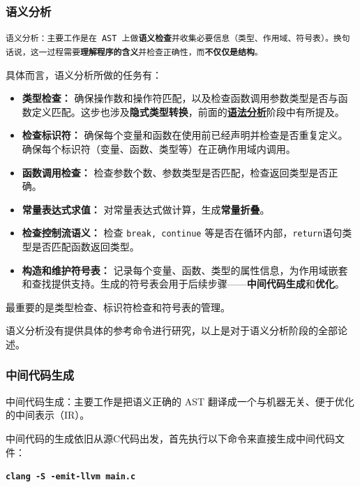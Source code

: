 \documentclass[UTF8,a4paper,10pt]{ctexart}
\begin{document}
\subsubsection{语义分析}
\texttt{\large{语义分析：主要工作是在 AST 上做\textbf{语义检查}并收集必要信息（类型、作用域、符号表）。换句话说，这一过程需要\textbf{理解程序的含义}并检查正确性，而\textbf{不仅仅是结构}。}}

\vspace{1em}

具体而言，语义分析所做的任务有：
\begin{itemize}
    \item \textbf{类型检查：} 确保操作数和操作符匹配，以及检查函数调用参数类型是否与函数定义匹配。这步也涉及\textbf{隐式类型转换}，前面的\hyperref[implicit-expr]{\textcolor{deepblue}{\textbf{语法分析}}}阶段中有所提及。
    \item \textbf{检查标识符：} 确保每个变量和函数在使用前已经声明并检查是否重复定义。确保每个标识符（变量、函数、类型等）在正确作用域内调用。
    \item \textbf{函数调用检查：} 检查参数个数、参数类型是否匹配，检查返回类型是否正确。
    \item \textbf{常量表达式求值：} 对常量表达式做计算，生成\textbf{常量折叠}。
    \item \textbf{检查控制流语义：} 检查 \texttt{break, continue} 等是否在循环内部，\texttt{return}语句类型是否匹配函数返回类型。
    \item \textbf{构造和维护符号表：} 记录每个变量、函数、类型的属性信息，为作用域嵌套和查找提供支持。生成的符号表会用于后续步骤——\textbf{中间代码生成}和\textbf{优化}。
\end{itemize}

最重要的是类型检查、标识符检查和符号表的管理。

\vspace{1em}

语义分析没有提供具体的参考命令进行研究，以上是对于语义分析阶段的全部论述。

\subsubsection{中间代码生成}
中间代码生成：主要工作是把语义正确的 AST 翻译成一个与机器无关、便于优化的中间表示（IR）。

\vspace{1em}

中间代码的生成依旧从源C代码出发，首先执行以下命令来直接生成中间代码文件：
\begin{center}
    \textcolor{deepblue}{\textbf{\texttt{\large{clang -S -emit-llvm main.c}}}}
\end{center}
\end{document}
